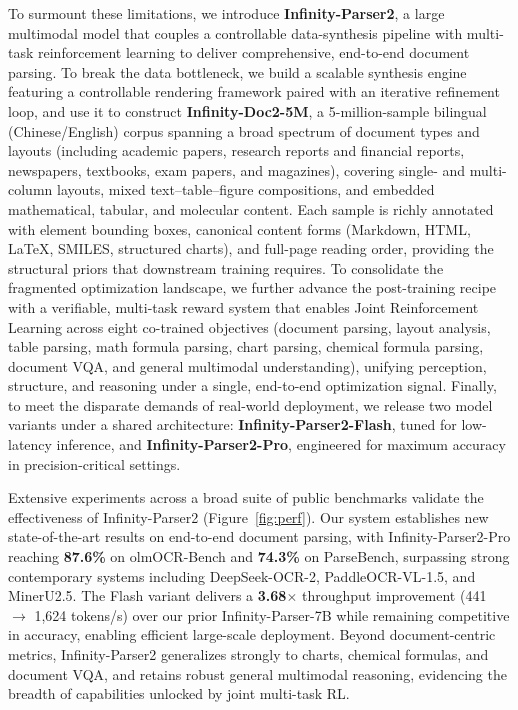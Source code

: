 To surmount these limitations, we introduce \textbf{Infinity-Parser2}, a large multimodal model that couples a controllable data-synthesis pipeline with multi-task reinforcement learning to deliver comprehensive, end-to-end document parsing. To break the data bottleneck, we build a scalable synthesis engine featuring a controllable rendering framework paired with an iterative refinement loop, and use it to construct \textbf{Infinity-Doc2-5M}, a 5-million-sample bilingual (Chinese/English) corpus spanning a broad spectrum of document types and layouts (including academic papers, research reports and financial reports, newspapers, textbooks, exam papers, and magazines), covering single- and multi-column layouts, mixed text–table–figure compositions, and embedded mathematical, tabular, and molecular content. Each sample is richly annotated with element bounding boxes, canonical content forms (Markdown, HTML, LaTeX, SMILES, structured charts), and full-page reading order, providing the structural priors that downstream training requires. To consolidate the fragmented optimization landscape, we further advance the post-training recipe with a verifiable, multi-task reward system that enables Joint Reinforcement Learning across eight co-trained objectives (document parsing, layout analysis, table parsing, math formula parsing, chart parsing, chemical formula parsing, document VQA, and general multimodal understanding), unifying perception, structure, and reasoning under a single, end-to-end optimization signal. Finally, to meet the disparate demands of real-world deployment, we release two model variants under a shared architecture: \textbf{Infinity-Parser2-Flash}, tuned for low-latency inference, and \textbf{Infinity-Parser2-Pro}, engineered for maximum accuracy in precision-critical settings.

Extensive experiments across a broad suite of public benchmarks validate the effectiveness of Infinity-Parser2 (Figure~\ref{fig:perf}). Our system establishes new state-of-the-art results on end-to-end document parsing, with Infinity-Parser2-Pro reaching \textbf{87.6\%} on olmOCR-Bench and \textbf{74.3\%} on ParseBench, surpassing strong contemporary systems including DeepSeek-OCR-2, PaddleOCR-VL-1.5, and MinerU2.5. The Flash variant delivers a \textbf{3.68$\times$} throughput improvement (441 $\rightarrow$ 1{,}624 tokens/s) over our prior Infinity-Parser-7B while remaining competitive in accuracy, enabling efficient large-scale deployment. Beyond document-centric metrics, Infinity-Parser2 generalizes strongly to charts, chemical formulas, and document VQA, and retains robust general multimodal reasoning, evidencing the breadth of capabilities unlocked by joint multi-task RL.


